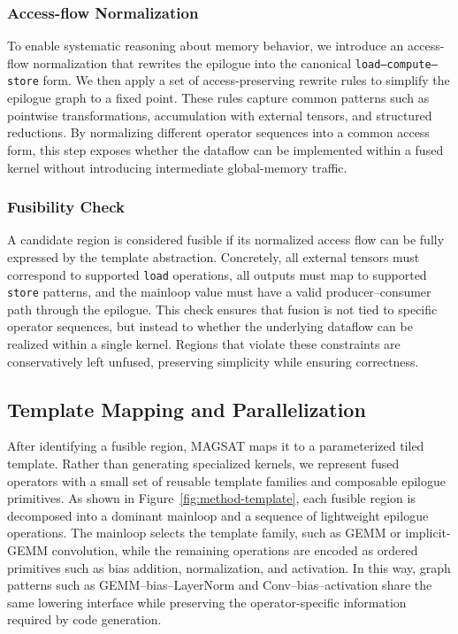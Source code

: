 \subsubsection{Access-flow Normalization}
To enable systematic reasoning about memory behavior, we introduce an
access-flow normalization that rewrites the epilogue into the canonical
\texttt{load--compute--store} form.
We then apply a set of access-preserving rewrite rules to simplify the
epilogue graph to a fixed point. These rules capture common patterns
such as pointwise transformations, accumulation with external tensors,
and structured reductions. By normalizing different operator sequences
into a common access form, this step exposes whether the dataflow can
be implemented within a fused kernel without introducing intermediate
global-memory traffic.

\subsubsection{Fusibility Check}
A candidate region is considered fusible if its normalized access flow
can be fully expressed by the template abstraction. Concretely, all
external tensors must correspond to supported \texttt{load} operations, all
outputs must map to supported \texttt{store} patterns, and the mainloop value
must have a valid producer–consumer path through the epilogue.
This check ensures that fusion is not tied to specific operator
sequences, but instead to whether the underlying dataflow can be
realized within a single kernel. Regions that violate these constraints
are conservatively left unfused, preserving simplicity while ensuring correctness.



\subsection{Template Mapping and Parallelization}
\label{sec:template}

After identifying a fusible region, MAGSAT maps it to a parameterized tiled
template. Rather than generating specialized kernels,
we represent fused operators with a small set of reusable template families and
composable epilogue primitives. 
As shown in Figure~\ref{fig:method-template}, each fusible region
is decomposed into a dominant mainloop and a sequence of lightweight epilogue
operations. The mainloop selects the template family, such as GEMM or
implicit-GEMM convolution, while the remaining operations are encoded as
ordered primitives such as bias addition, normalization, and activation. In
this way, graph patterns such as GEMM--bias--LayerNorm and
Conv--bias--activation share the same lowering interface while preserving the
operator-specific information required by code generation.

